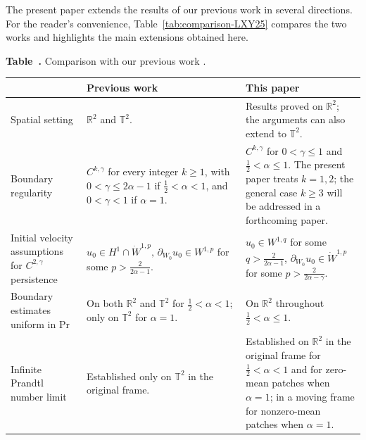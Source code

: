 \documentclass[reqno,11pt,a4paper]{amsart}
\begin{document}
The present paper extends the results of our previous work
\cite{LXY25} in several directions.
For the reader's convenience, Table~\ref{tab:comparison-LXY25}
compares the two works and highlights the main extensions
obtained here.

\begin{center}
\label{tab:comparison-LXY25}
\begin{minipage}{\textwidth}
\centering
\small
\textbf{Table~\thetable.}
Comparison with our previous work \cite{LXY25}.
\par\medskip
\renewcommand{\arraystretch}{1.22}
\begin{tabular}{@{}
  >{\raggedright\arraybackslash}m{}|
  >{\raggedright\arraybackslash}m{}|
  >{\raggedright\arraybackslash}m{}@{}}
\hline
& \textbf{Previous work \cite{LXY25}}
& \textbf{This paper}
\\ \hline
Spatial setting
& $\mathbb{R}^2$ and $\mathbb{T}^2$.
& Results proved on $\mathbb{R}^2$;
  the arguments can also extend to $\mathbb{T}^2$.
\\ \hline
Boundary regularity
& $C^{k,\gamma}$ for every integer $k\geq1$, with
  $0<\gamma\leq2\alpha-1$ if $\frac12<\alpha<1$,
  and $0<\gamma<1$ if $\alpha=1$.
& $C^{k,\gamma}$ for $0<\gamma\leq1$ and $\frac12<\alpha\leq1$.
The present paper treats $k=1,2$; the general case $k\geq3$
will be addressed in a forthcoming paper.
\\ \hline
Initial velocity assumptions
for $C^{2,\gamma}$ persistence
& $u_0\in H^1\cap\dot W^{1,p},\,\partial_{W_0}u_0\in W^{1,p}$ for some $p>\frac{2}{2\alpha-1}$.
& $u_0\in W^{1,q}$ for some $q>\frac{2}{2\alpha-1}$, $\partial_{W_0}u_0\in\dot W^{1,p}$ for some $p>\frac{2}{2\alpha-\gamma}$.
\\ \hline
Boundary estimates uniform in $\mathrm{Pr}$
& On both $\mathbb{R}^2$ and $\mathbb{T}^2$
  for $\frac12<\alpha<1$;
  only on $\mathbb{T}^2$ for $\alpha=1$.
& On $\mathbb{R}^2$ throughout
  $\frac12<\alpha\leq1$.
\\ \hline
Infinite Prandtl number limit
& Established only on $\mathbb{T}^2$ in the original frame.
& 
Established on $\mathbb R^2$ in the original frame
for $\frac12<\alpha<1$ and for zero-mean patches when $\alpha=1$;
in a moving frame for nonzero-mean patches when $\alpha=1$.
\\ \hline
\end{tabular}
\end{minipage}
\end{center}
\end{document}
